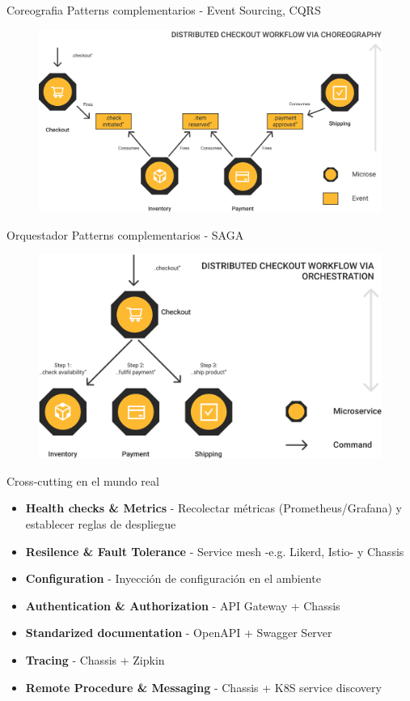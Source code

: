 \documentclass[aspectratio=169]{beamer}
\begin{document}
\begin{frame}{Coreografia}
	Patterns complementarios - Event Sourcing, CQRS
	\begin{figure}
		\centering
		\includegraphics[width=0.7\linewidth]{Images/mpcore}
	\end{figure}
\end{frame}

\begin{frame}{Orquestador}
	Patterns complementarios - SAGA
	\begin{figure}
		\centering
		\includegraphics[width=0.7\linewidth]{Images/mporch}
	\end{figure}
	
\end{frame}

\begin{frame}{Cross-cutting en el mundo real}
	
	\begin{itemize}
		\item \textbf{Health checks \& Metrics} - Recolectar métricas  (Prometheus/Grafana) y establecer reglas de despliegue
		\item \textbf{Resilence \& Fault Tolerance} - Service mesh -e.g. Likerd, Istio- y Chassis
		\item \textbf{Configuration} - Inyección de configuración en el ambiente
		\item \textbf{Authentication \& Authorization} - API Gateway + Chassis
		\item \textbf{Standarized documentation} - OpenAPI + Swagger Server
		\item \textbf{Tracing} - Chassis + Zipkin
		\item\textbf{ Remote Procedure \& Messaging} - Chassis + K8S service discovery
	\end{itemize}
	
\end{frame}
\end{document}
